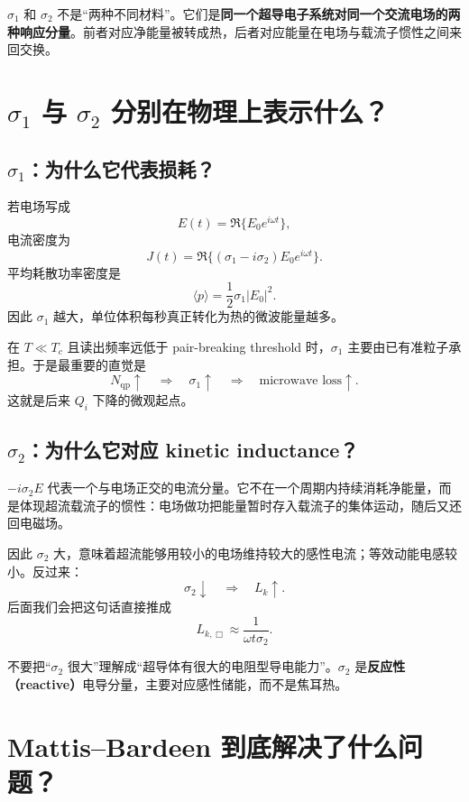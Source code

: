 \documentclass[11pt,a4paper,openany]{ctexrep}
\newcommand{\qp}{\mathrm{qp}}
\begin{document}
\begin{intuitionbox}
$\sigma_1$ 和 $\sigma_2$ 不是“两种不同材料”。它们是\textbf{同一个超导电子系统对同一个交流电场的两种响应分量}。前者对应净能量被转成热，后者对应能量在电场与载流子惯性之间来回交换。
\end{intuitionbox}

\section{$\sigma_1$ 与 $\sigma_2$ 分别在物理上表示什么？}

\subsection{$\sigma_1$：为什么它代表损耗？}

若电场写成
\[
E(t)=\Re\{E_0e^{i\omega t}\},
\]
电流密度为
\[
J(t)=\Re\{(\sigma_1-i\sigma_2)E_0e^{i\omega t}\}.
\]
平均耗散功率密度是
\[
\boxed{
\langle p\rangle=\frac12\sigma_1|E_0|^2.
}
\]
因此 $\sigma_1$ 越大，单位体积每秒真正转化为热的微波能量越多。

在 $T\ll T_c$ 且读出频率远低于 pair-breaking threshold 时，$\sigma_1$ 主要由已有准粒子承担。于是最重要的直觉是
\[
\boxed{
N_{\qp}\uparrow\quad\Longrightarrow\quad\sigma_1\uparrow\quad\Longrightarrow\quad\text{microwave loss}\uparrow.
}
\]
这就是后来 $Q_i$ 下降的微观起点。

\subsection{$\sigma_2$：为什么它对应 kinetic inductance？}

$-i\sigma_2E$ 代表一个与电场正交的电流分量。它不在一个周期内持续消耗净能量，而是体现超流载流子的惯性：电场做功把能量暂时存入载流子的集体运动，随后又还回电磁场。

因此 $\sigma_2$ 大，意味着超流能够用较小的电场维持较大的感性电流；等效动能电感较小。反过来：
\[
\boxed{
\sigma_2\downarrow
\quad\Longrightarrow\quad
L_k\uparrow.
}
\]
后面我们会把这句话直接推成
\[
L_{k,\Box}\approx\frac{1}{\omega t\sigma_2}.
\]

\begin{mistakebox}
不要把“$\sigma_2$ 很大”理解成“超导体有很大的电阻型导电能力”。$\sigma_2$ 是\textbf{反应性（reactive）}电导分量，主要对应感性储能，而不是焦耳热。
\end{mistakebox}

\section{Mattis--Bardeen 到底解决了什么问题？}
\end{document}
